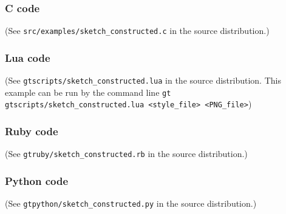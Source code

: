 \documentclass[a4paper]{scrreprt}
\begin{document}
\subsubsection{C code}
(See \texttt{src/examples/sketch\_constructed.c} in the source distribution.)

\subsubsection{Lua code}
(See \texttt{gtscripts/sketch\_constructed.lua} in the source distribution.  This example can be run by the command line \texttt{gt gtscripts/sketch\_constructed.lua <style\_file> <PNG\_file>})

\subsubsection{Ruby code}
(See \texttt{gtruby/sketch\_constructed.rb} in the source distribution.)

\subsubsection{Python code}
(See \texttt{gtpython/sketch\_constructed.py} in the source distribution.)



%
\end{document}
